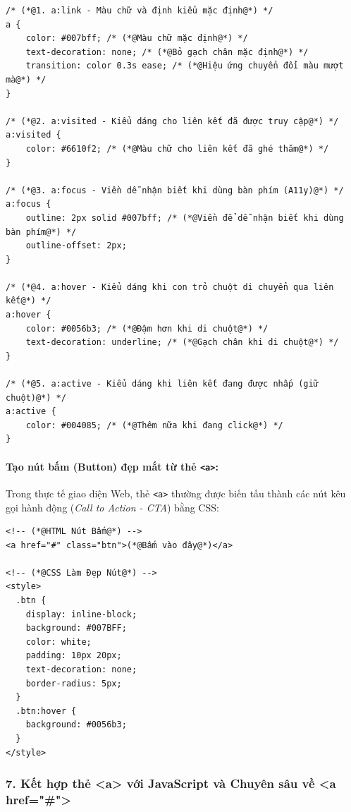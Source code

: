 \documentclass[11pt,oneside]{book}
\newcommand{\codeinline}[1]{\textcolor{accentOrange}{\texttt{#1}}}
\begin{document}
\begin{codeWindow}
\begin{lstlisting}[language=HTML5]
/* (*@1. a:link - Màu chữ và định kiểu mặc định@*) */
a {
    color: #007bff; /* (*@Màu chữ mặc định@*) */
    text-decoration: none; /* (*@Bỏ gạch chân mặc định@*) */
    transition: color 0.3s ease; /* (*@Hiệu ứng chuyển đổi màu mượt mà@*) */
}

/* (*@2. a:visited - Kiểu dáng cho liên kết đã được truy cập@*) */
a:visited {
    color: #6610f2; /* (*@Màu chữ cho liên kết đã ghé thăm@*) */
}

/* (*@3. a:focus - Viền dễ nhận biết khi dùng bàn phím (A11y)@*) */
a:focus {
    outline: 2px solid #007bff; /* (*@Viền để dễ nhận biết khi dùng bàn phím@*) */
    outline-offset: 2px;
}

/* (*@4. a:hover - Kiểu dáng khi con trỏ chuột di chuyển qua liên kết@*) */
a:hover {
    color: #0056b3; /* (*@Đậm hơn khi di chuột@*) */
    text-decoration: underline; /* (*@Gạch chân khi di chuột@*) */
}

/* (*@5. a:active - Kiểu dáng khi liên kết đang được nhấp (giữ chuột)@*) */
a:active {
    color: #004085; /* (*@Thêm nữa khi đang click@*) */
}
\end{lstlisting}
\end{codeWindow}

\paragraph{Tạo nút bấm (Button) đẹp mắt từ thẻ \codeinline{<a>}:}
Trong thực tế giao diện Web, thẻ \codeinline{<a>} thường được biến tấu thành các nút kêu gọi hành động (\textit{Call to Action - CTA}) bằng CSS:

\begin{codeWindow}
\begin{lstlisting}[language=HTML5]
<!-- (*@HTML Nút Bấm@*) -->
<a href="#" class="btn">(*@Bấm vào đây@*)</a>

<!-- (*@CSS Làm Đẹp Nút@*) -->
<style>
  .btn {
    display: inline-block;
    background: #007BFF;
    color: white;
    padding: 10px 20px;
    text-decoration: none;
    border-radius: 5px;
  }
  .btn:hover {
    background: #0056b3;
  }
</style>
\end{lstlisting}
\end{codeWindow}

\subsubsection{7. Kết hợp thẻ <a> với JavaScript và Chuyên sâu về <a href="\#">}
\end{document}
